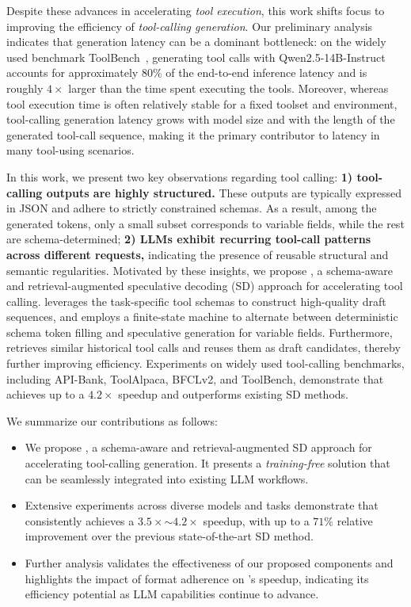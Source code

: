 Despite these advances in accelerating \textit{tool execution}, this work shifts focus to improving the efficiency of \textit{tool-calling generation}. Our preliminary analysis indicates that generation latency can be a dominant bottleneck: on the widely used benchmark ToolBench~\cite{Qin:2024toolllm}, generating tool calls with Qwen2.5-14B-Instruct accounts for approximately $80\%$ of the end-to-end inference latency and is roughly $4\times$ larger than the time spent executing the tools. Moreover, whereas tool execution time is often relatively stable for a fixed toolset and environment, tool-calling generation latency grows with model size and with the length of the generated tool-call sequence, making it the primary contributor to latency in many tool-using scenarios.

In this work, we present two key observations regarding tool calling: \textbf{1) tool-calling outputs are highly structured.} These outputs are typically expressed in JSON and adhere to strictly constrained schemas. As a result, among the generated tokens, only a small subset corresponds to variable fields, while the rest are schema-determined; \textbf{2) LLMs exhibit recurring tool-call patterns across different requests,} indicating the presence of reusable structural and semantic regularities. Motivated by these insights, we propose \method, a schema-aware and retrieval-augmented speculative decoding (SD) approach for accelerating tool calling. \method leverages the task-specific tool schemas to construct high-quality draft sequences, and employs a finite-state machine to alternate between deterministic schema token filling and speculative generation for variable fields. Furthermore, \method retrieves similar historical tool calls and reuses them as draft candidates, thereby further improving efficiency. Experiments on widely used tool-calling benchmarks, including API-Bank, ToolAlpaca, BFCLv2, and ToolBench, demonstrate that \method achieves up to a $4.2\times$ speedup and outperforms existing SD methods.

We summarize our contributions as follows:
\begin{itemize}
    \item We propose \method, a schema-aware and retrieval-augmented SD approach for accelerating tool-calling generation. It presents a \textit{training-free} solution that can be seamlessly integrated into existing LLM workflows.
    \item Extensive experiments across diverse models and tasks demonstrate that \method consistently achieves a $3.5\times$$\sim$$4.2\times$ speedup, with up to a $71\%$ relative improvement over the previous state-of-the-art SD method.
    \item Further analysis validates the effectiveness of our proposed components and highlights the impact of format adherence on \method’s speedup, indicating its efficiency potential as LLM capabilities continue to advance.
\end{itemize}